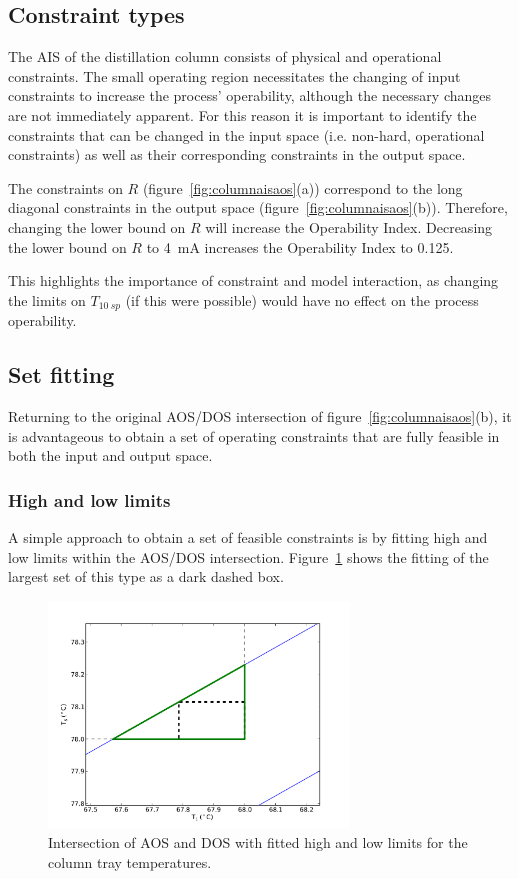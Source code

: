 \documentclass[final,authoryear,5pt,times,twocolumn]{elsarticle}
\begin{document}
\subsection{Constraint types}
The AIS of the distillation column consists of physical and operational constraints.
The small operating region necessitates the changing of input constraints to increase the process' operability, although the necessary changes are not immediately apparent.
For this reason it is important to identify the constraints that can be changed in the input space (i.e. non-hard, operational constraints) as well as their corresponding constraints in the output space.

The constraints on $R$ (figure~\ref{fig:columnaisaos}(a)) correspond to the long diagonal constraints in the output space (figure~\ref{fig:columnaisaos}(b)).
Therefore, changing the lower bound on $R$ will increase the Operability Index.
Decreasing the lower bound on $R$ to 4~mA increases the Operability Index to 0.125.

This highlights the importance of constraint and model interaction, as changing the limits on $T_{10~sp}$ (if this were possible) would have no effect on the process operability.

\subsection{Set fitting}
Returning to the original AOS/DOS intersection of figure~\ref{fig:columnaisaos}(b), it is advantageous to obtain a set of operating constraints that are fully feasible in both the input and output space.

\subsubsection{High and low limits}
A simple approach to obtain a set of feasible constraints is by fitting high and low limits within the AOS/DOS intersection.
Figure~\ref{fig:columnfitbox} shows the fitting of the largest set of this type as a dark dashed box.
 
\begin{figure}[htbp]
  \centering
    \includegraphics[width=8cm]{columnfitbox.pdf}
  \caption[Fitted constraints for the laboratory distillation column]{Intersection of AOS and DOS with fitted high and low limits for the column tray temperatures.}
  \label{fig:columnfitbox}
\end{figure}
\end{document}
